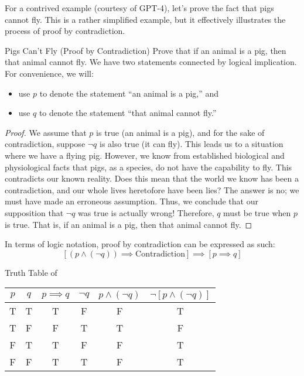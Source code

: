For a contrived example (courtesy of GPT-4), let's prove the fact that pigs cannot fly. This is a rather simplified example, but it effectively illustrates the process of proof by contradiction.

\begin{exbox}{Pigs Can't Fly (Proof by Contradiction)}{}
    Prove that if an animal is a pig, then that animal cannot fly.
    \tcblower
    We have two statements connected by logical implication. For convenience, we will:
    \begin{itemize}
        \item use $p$ to denote the statement ``an animal is a pig,'' and
        \item use $q$ to denote the statement ``that animal cannot fly.''
    \end{itemize}
    \begin{proof}
        We assume that $p$ is true (an animal is a pig), and for the sake of contradiction, suppose $\neg q$ is also true (it can fly). This leads us to a situation where we have a flying pig. However, we know from established biological and physiological facts that pigs, as a species, do not have the capability to fly. This contradicts our known reality.
        Does this mean that the world we know has been a contradiction, and our whole lives heretofore have been lies? The answer is no; we must have made an erroneous assumption.
        Thus, we conclude that our supposition that $\neg q$ was true is actually wrong! Therefore, $q$ must be true when $p$ is true. That is, if an animal is a pig, then that animal cannot fly.
    \end{proof}
\end{exbox}

In terms of logic notation, proof by contradiction can be expressed as such:
\[ \left[ \left( p \land (\neg q) \right) \implies \text{Contradiction} \right] \implies \left[ p \implies q \right]\]

\begin{exbox}{Truth Table of }{}
    \begin{center}\begin{tabular}{c | c || c | c | c | c }
        $p$ & $q$ & $p \implies q$ & $\neg q$ & $p \land (\neg q)$ & $\neg \left[ p \land (\neg q) \right]$ \\ \hline
        T & T & T & F & F & T \\
        T & F & F & T & T & F \\
        F & T & T & F & F & T \\
        F & F & T & T & F & T
    \end{tabular}\end{center}
\end{exbox}

